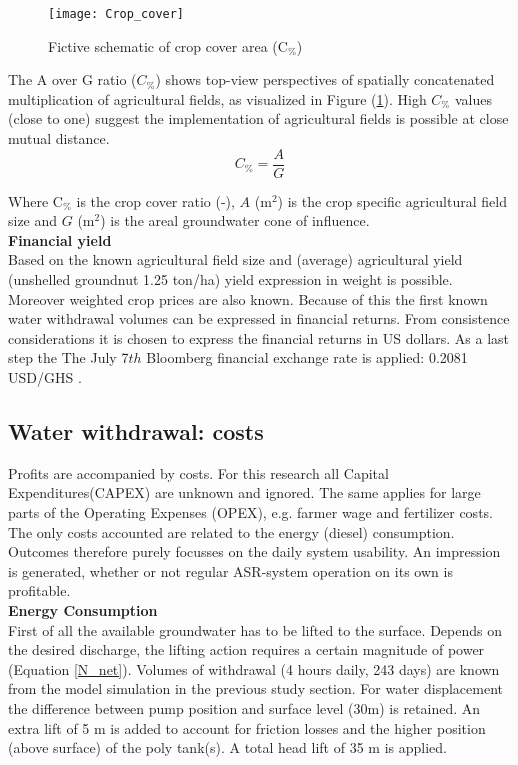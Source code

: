 \begin{figure}[h]
 \centering\texttt{[image: Crop\_cover]}
 \captionsetup{justification=centering}
 \caption{Fictive schematic of crop cover area (C$_\%$)}
 \label{fig:Crop_cover}
\end{figure}

The A over G ratio ($C_{\%}$) shows top-view perspectives of spatially concatenated multiplication of agricultural fields, as visualized in Figure (\ref{fig:Crop_cover}). High $C_{\%}$ values (close to one) suggest the implementation of agricultural fields is possible at close mutual distance. \\

\begin{equation}
 C_{\%} = \frac{A}{G}
\label{eq:RR}
\end{equation}

Where  C$_{\%}$ is the crop cover ratio (-), $A$ (m$^2$) is the crop specific agricultural field size and $G$ (m$^2$) is the areal groundwater cone of influence. \\

\textbf{Financial yield} \\
Based on the known agricultural field size and (average) agricultural yield (unshelled groundnut 1.25 ton/ha) yield expression in weight is possible. Moreover weighted crop prices are also known. Because of this the first known water withdrawal volumes can be expressed in financial returns. From consistence considerations it is chosen to express the financial returns in US dollars. As a last step the The July 7$th$ Bloomberg financial exchange rate is applied: 0.2081 USD/GHS \citep{Bloomberg2018}. \\

\subsection{Water withdrawal: costs}
Profits are accompanied by costs. For this research all Capital Expenditures(CAPEX) are unknown and ignored. The same applies for large parts of the Operating Expenses (OPEX), e.g. farmer wage and fertilizer costs. The only costs accounted are related to the energy (diesel) consumption. Outcomes therefore purely focusses on the daily system usability. An impression is generated, whether or not regular ASR-system operation on its own is profitable. \\

\textbf{Energy Consumption} \\
First of all the available groundwater has to be lifted to the surface. Depends on the desired discharge, the lifting action requires a certain magnitude of power (Equation \ref{N_net}). Volumes of withdrawal (4 hours daily, 243 days) are known from the model simulation in the previous study section. For water displacement the difference between pump position and surface level (30m) is retained. An extra lift of 5 m is added to account for friction losses and the higher position (above surface) of the poly tank(s). A total head lift of 35 m is applied.

